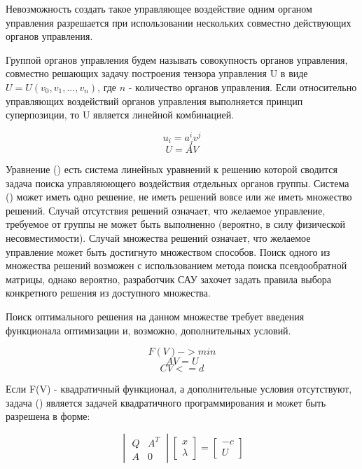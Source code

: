\documentclass[a4paper]{article}
\begin{document}
Невозможность создать такое управляющее воздействие одним органом управления разрешается при использовании нескольких совместно действующих органов управления.

Группой органов управления будем называть совокупность органов управления, совместно решающих задачу построения тензора управления U в виде $U = U(v_0, v_1, ..., v_n)$, где $n$ - количество органов управления. Если относительно управляющих воздействий органов управления выполняется принцип суперпозиции, то U является линейной комбинацией. 

\begin{equation}u_i=a^i_jv^j\end{equation}
\begin{equation}U=AV\end{equation}

Уравнение () есть система линейных уравнений к решению которой сводится задача поиска управляюющего воздействия отдельных органов группы. Система () может иметь одно решение, не иметь решений вовсе или же иметь множество решений. Случай отсутствия решений означает, что желаемое управление, требуемое от группы не может быть выполненно (вероятно, в силу физической несовместимости). Случай множества решений означает, что желаемое управление может быть достигнуто множеством способов. Поиск одного из множества решений возможен с использованием метода поиска псевдообратной матрицы, однако вероятно, разработчик САУ захочет задать правила выбора конкретного решения из доступного множества.

Поиск оптимального решения на данном множестве требует введения функционала оптимизации и, возможно, дополнительных условий.

\begin{equation}F(V) -> min\end{equation}
\begin{equation}AV = U\end{equation}
\begin{equation}CV <= d\end{equation}

Если F(V) - квадратичный функционал, а дополнительные условия отсутствуют, задача () является задачей квадратичного программирования и может быть разрешена в форме:

\begin{equation}
\begin{vmatrix}
Q & A^T\\
A & 0
\end{vmatrix}
\begin{bmatrix}
x\\
\lambda
\end{bmatrix}
=
\begin{bmatrix}
-c\\
U
\end{bmatrix}
\end{equation}
\end{document}
